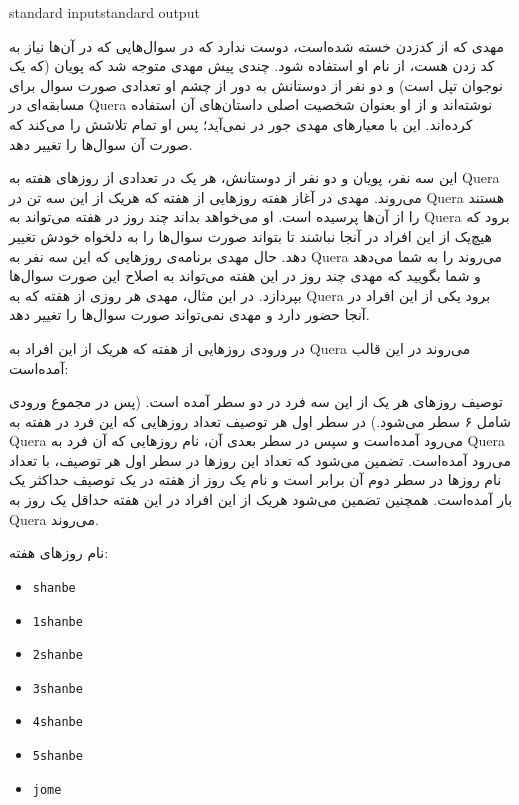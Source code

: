 \begin{problem}{}
{standard input}{standard output}
{}{}{}

    مهدی که از کدزدن خسته شده‌است، دوست ندارد که در سوال‌هایی که در آن‌ها نیاز به کد زدن هست، از نام او استفاده شود. چندی پیش مهدی متوجه شد که پویان (که یک نوجوان تپل است) و دو نفر از دوستانش به دور از چشم او تعدادی صورت سوال برای مسابقه‌ای در Quera نوشته‌اند و از او بعنوان شخصیت اصلی داستان‌های آن استفاده کرده‌اند. این با معیارهای مهدی جور در نمی‌آید؛ پس او تمام تلاشش را می‌کند که صورت آن سوال‌ها را تغییر دهد.

    این سه نفر، پویان و دو نفر از دوستانش، هر یک در تعدادی از روزهای هفته به Quera می‌روند. مهدی در آغاز هفته روزهایی از هفته که هریک از این سه تن در Quera هستند را از آن‌ها پرسیده است. او می‌خواهد بداند چند روز در هفته می‌تواند به Quera برود که هیچ‌یک از این افراد در آنجا نباشند تا بتواند صورت سوال‌ها را به دلخواه خودش تغییر دهد. حال مهدی برنامه‌ی روزهایی که این سه نفر به Quera می‌روند را به شما می‌دهد و شما بگویید که مهدی چند روز در این هفته می‌تواند به اصلاح این صورت سوال‌ها بپردازد.
    \Explanations
    در این مثال، مهدی هر روزی از هفته که به Quera برود یکی از این افراد در آنجا حضور دارد و مهدی نمی‌تواند صورت سوال‌ها را تغییر دهد.


    در ورودی روز‌هایی از هفته که هریک از این افراد به Quera می‌روند در این قالب آمده‌است:

    توصیف روز‌های هر یک از این سه فرد در دو سطر آمده است. (پس در مجموع ورودی شامل ۶ سطر می‌شود.) در سطر اول هر توصیف تعداد روز‌هایی که این فرد در هفته به Quera می‌رود آمده‌است و سپس در سطر بعدی آن، نام روز‌هایی که آن فرد به Quera می‌رود آمده‌است. تضمین می‌شود که تعداد این روز‌ها در سطر اول هر توصیف، با تعداد نام روزها در سطر دوم آن برابر است و نام یک روز از هفته در یک توصیف حداکثر یک‌ بار آمده‌است. همچنین تضمین می‌شود هریک از این افراد در این هفته حداقل یک روز به Quera می‌روند.

    نام روز‌های هفته:
    \begin{itemize}
        \item \texttt{shanbe}
        \item \texttt{1shanbe}
        \item \texttt{2shanbe}
        \item \texttt{3shanbe}
        \item \texttt{4shanbe}
        \item \texttt{5shanbe}
        \item \texttt{jome}
    \end{itemize}


\end{problem}
